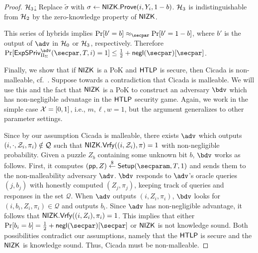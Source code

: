 \begin{proof}
    \underline{$\mathcal{H}_3$:} Replace $\tilde{\sigma}$ with $\sigma \gets \mathsf{NIZK}.\mathsf{Prove}(i, Y_i, 1-b)$. $\mathcal{H}_3$ is indistinguishable from $\mathcal{H}_2$ by the zero-knowledge property of $\sf NIZK$.

    This series of hybrids implies $\Pr[b'=b] \approx_\secpar \Pr[b'=1-b]$, where $b'$ is the output of $\adv$ in $\mathcal{H}_0$ or $\mathcal{H}_3$, respectively. Therefore $\Pr[\Exp = 1] \leq \frac{1}{2} + \negl[\secpar]$.
    


    Finally, we show that if $\mathsf{NIZK}$ is a PoK and $\mathsf{HTLP}$ is secure, then Cicada is non-malleable, cf.~. Suppose towards a contradiction that Cicada is malleable. We will use this and the fact that $\mathsf{NIZK}$ is a PoK to construct an adversary $\bdv$ which has non-negligible advantage in the $\mathsf{HTLP}$ security game. Again, we work in the simple case $\mathcal{X} = [0,1]$, i.e., $m,\ell,w=1$, but the argument generalizes to other parameter settings.
    
    Since by our assumption Cicada is malleable, there exists $\adv$ which outputs $(i, \cdot, \mathcal{Z}_i, \pi_i) \notin \mathcal{Q}$ such that $\mathsf{NIZK}.\mathsf{Vrfy}((i,\allowbreak \mathcal{Z}_i), \pi)=1$ with non-negligible probability. 
    Given a puzzle $Z_b$ containing some unknown bit $b$, $\bdv$ works as follows. First, it computes $(\pp, Z) \sample \Setup(\secparam, \Ttime, 1)$ and sends them to the non-malleability adversary $\adv$. $\bdv$ responds to $\adv$'s oracle queries $(j, b_j)$ with honestly computed $(Z_j, \pi_j)$, keeping track of queries and responses in the set $\mathcal{Q}$. When $\adv$ outputs $(i, Z_i, \pi_i)$, $\bdv$ looks for $(i, b_i, Z_i, \pi_i) \in \mathcal{Q}$ and outputs $b_i$. Since $\adv$ has non-negligible advantage, it follows that $\mathsf{NIZK}.\mathsf{Vrfy}((i, Z_i), \pi_i) = 1$. This implies that either $\Pr[b_i=b] = \frac{1}{2} + \negl[\secpar]$ or $\mathsf{NIZK}$ is not knowledge sound. Both possibilities contradict our assumptions, namely that the $\mathsf{HTLP}$ is secure and the $\mathsf{NIZK}$ is knowledge sound. Thus, Cicada must be non-malleable.
\end{proof}